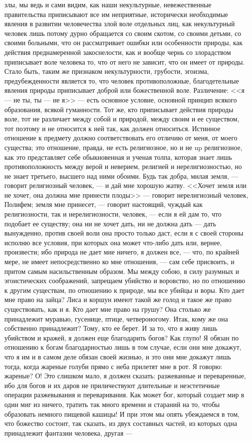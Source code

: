 \documentclass[12pt]{article}
\begin{document}
злы, мы ведь и сами видим, как наши некультурные, невежественные правительства приписывают все им неприятные, исторически необходимые явления в развитии человечества злой воле отдельных лиц, как некультурный человек лишь потому дурно обращается со своим скотом, со своими детьми, со своими больными, что он рассматривает ошибки или особенности природы, как действия преднамеренной закоснелости, как и вообще чернь со злорадством приписывает воле человека то, что от него не зависит, что он имеет от природы. Стало быть, таким же признаком некультурности, грубости, эгоизма, предубежденности является то, что человек противоположные, благодетельные явления природы приписывает доброй или божественной воле. Различение: <<я --- не ты, ты --- не я>> --- есть основное условие, основной принцип всякого образования, всякой гуманности. Тот же, кто приписывает действия природы воле, тот не различает между собой и природой, между своим и ее существом, тот поэтому и не относится к ней так, как должен относиться. Истинное отношение к предмету должно соответствовать его отличию от меня, от моего существа; это отношение, правда, не есть религиозное, но и не up религиозное, как это представляет себе обыкновенная и ученая толпа, которая знает лишь противоположность между верой и неверием, религией и нерелигиозностью, но не знает третьего, высшего над ними обоими. Будь так добра, милая земля, --- говорит религиозный человек, --- и дай мне хорошую жатву. <<Хочет земля или не хочет, она должна мне принести плоды>>  --- говорит нерелигиозный человек, Полифем; земля мне принесет, --- говорит настоящий, чуждый как религиозности, так и нерелигиозности, человек, --- если я ей дам то, что подобает ее существу; она ни не хочет дать, ни не должна дать --- дать вынужденно, против своей воли она просто только даст, если я с своей стороны исполню все условия, при которых она может что-либо дать или, вернее, произвести; ибо природа не дает мне ничего, я должен все, --- что, по крайней мере, не имеет непосредственно ко мне отношения, --- сам себе присвоить, и притом самым насильственным образом. Мы между собою, в силу разумных и эгоистических соображений, запрещаем убийство и воровство, но по отношению к другим существам, по отношению к природе, мы все убийцы и воры. Кто дает мне право на зайца? Лиса и коршун имеют такой же голод и такое же право существовать, как и я. Кто дает мне право на грушу? Она столько же принадлежит муравью, гусенице, птице, четвероногому. Итак, кому же она собственно принадлежит? Тому, кто ее берет. И за то, что я живу лишь убийством и кражей, я должен еще благодарить богов? Как глупо! Я обязан по отношению к богам благодарностью лишь в том случае, если они мне докажут, что я им и в самом деле обязан своей жизнью, и это они мне докажут лишь тогда, когда жареные голуби прямо с неба прилетят мне в рот. Я говорю: жареные? О! Это слишком мало, я должен сказать: разжеванные и переваренные, ибо для богов и их даров не приличествуют длительные и неэстетичные операции разжевывания и переваривания. Как может бог, который создает мир в один миг из ничего, тратить так много времени и стараний на то, чтобы образовать немного пищевой кашицы! И при этом мы опять убеждаемся в том, что божество состоит, так сказать, из двух составных частей, из которых одна принадлежит фантазии человека, другая --- 
\end{document}
